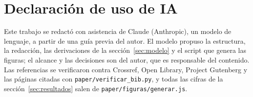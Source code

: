 \documentclass[11pt,a4paper]{article}
\begin{document}
\section*{Declaración de uso de IA}

Este trabajo se redactó con asistencia de Claude (Anthropic), un modelo de lenguaje, a partir de una guía previa del autor. El modelo propuso la estructura, la redacción, las derivaciones de la sección~\ref{sec:modelo} y el script que genera las figuras; el alcance y las decisiones son del autor, que es responsable del contenido. Las referencias se verificaron contra Crossref, Open Library, Project Gutenberg y las páginas citadas con \texttt{paper/verificar\_bib.py}, y todas las cifras de la sección~\ref{sec:resultados} salen de \texttt{paper/figuras/generar.js}.

\printbibliography
\end{document}
